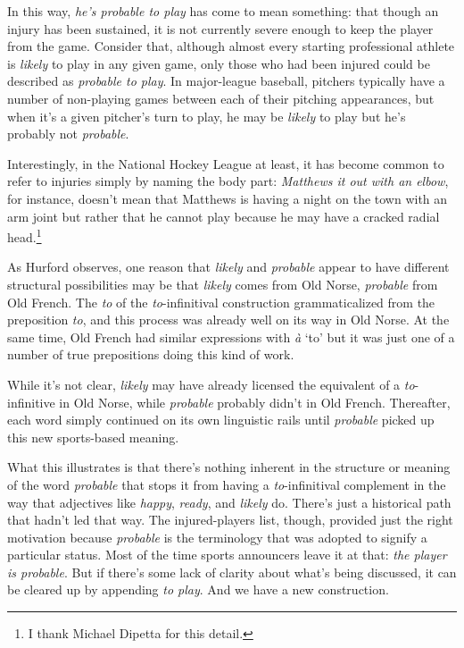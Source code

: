 In this way, \textit{he's probable to play} has come to mean something: that though an injury has been sustained, it is not currently severe enough to keep the player from the game. Consider that, although almost every starting professional athlete is \textit{likely} to play in any given game, only those who had been injured could be described as \textit{probable to play}. In major-league baseball, pitchers typically have a number of non-playing games between each of their pitching appearances, but when it's a given pitcher's turn to play, he may be \textit{likely} to play but he's probably not \textit{probable}.

Interestingly, in the National Hockey League at least, it has become common to refer to injuries simply by naming the body part: \textit{Matthews it out with an elbow}, for instance, doesn't mean that Matthews is having a night on the town with an arm joint but rather that he cannot play because he may have a cracked radial head.\footnote{I thank Michael Dipetta for this detail.}

\bigskip

As Hurford observes, one reason that \textit{likely} and \textit{probable} appear to have different structural possibilities may be that \textit{likely} comes from Old Norse, \textit{probable} from Old French. The \textit{to} of the \textit{to}-infinitival construction grammaticalized from the preposition \textit{to}, and this process was already well on its way in Old Norse. At the same time, Old French had similar expressions with \textit{à} `to' but it was just one of a number of true prepositions doing this kind of work.

While it's not clear, \textit{likely} may have already licensed the equivalent of a \textit{to}-infinitive in Old Norse, while \textit{probable} probably didn't in Old French. Thereafter, each word simply continued on its own linguistic rails until \textit{probable} picked up this new sports-based meaning.

What this illustrates is that there's nothing inherent in the structure or meaning of the word \textit{probable} that stops it from having a \textit{to}-infinitival complement in the way that adjectives like \textit{happy}, \textit{ready}, and \textit{likely} do. There's just a historical path that hadn't led that way. The injured-players list, though, provided just the right motivation because \textit{probable} is the terminology that was adopted to signify a particular status. Most of the time sports announcers leave it at that: \textit{the player is probable}. But if there's some lack of clarity about what's being discussed, it can be cleared up by appending \textit{to play}. And we have a new construction.

